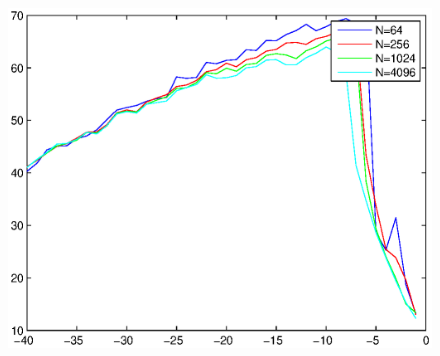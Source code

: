 \documentclass{article}
\begin{document}
\begin{figure}[H]
\includegraphics{test2.eps}
\end{figure}

\newpage
\end{document}
